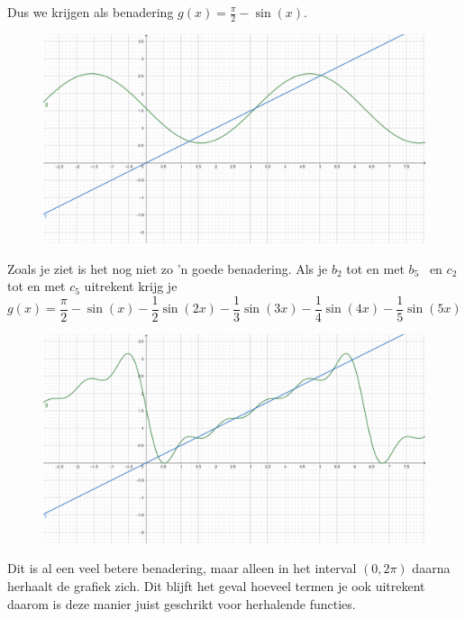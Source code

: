 \documentclass[../main.tex]{subfiles}
\begin{document}
Dus we krijgen als benadering $g(x)=\frac{\pi}{2}-\sin(x)$.
\begin{figure}[h]
    \centering
    \includegraphics[width=.55\textwidth]{./img/fourier_1.png}
    \label{fig:my_label}
\end{figure}

Zoals je ziet is het nog niet zo 'n goede benadering. Als je $b_2$ tot en met $b_5$ \ en $c_2$ tot en met $c_5$ uitrekent krijg je $$g(x)=\frac{\pi}{2}-\sin(x)-\frac{1}{2}\sin(2x)-\frac{1}{3}\sin(3x)-\frac{1}{4}\sin(4x)-\frac{1}{5}\sin(5x)$$
\begin{figure}[h]
    \centering
    \includegraphics[width=.55\textwidth]{./img/fourier_2.png}
    \label{fig:my_label}
\end{figure}

Dit is al een veel betere benadering, maar alleen in het interval $(0,2\pi)$ daarna herhaalt de grafiek zich. Dit blijft het geval hoeveel termen je ook uitrekent daarom is deze manier juist geschrikt voor herhalende functies.
\end{document}
